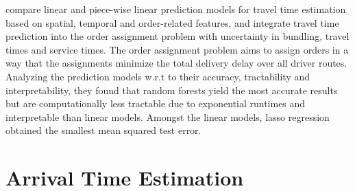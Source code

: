 \cite{Liu2018_LM_PLM} compare linear and piece-wise linear prediction models for travel time estimation based on spatial, temporal and order-related features, and integrate travel time prediction into the order assignment problem with uncertainty in bundling, travel times and service times. The order assignment problem aims to assign orders in a way that the assignments minimize the total delivery delay over all driver routes. Analyzing the prediction models w.r.t to their accuracy, tractability and interpretability, they found that random forests yield the most accurate results but are computationally less tractable due to exponential runtimes and interpretable than linear models. Amongst the linear models, lasso regression obtained the smallest mean squared test error.


\section{Arrival Time Estimation}




